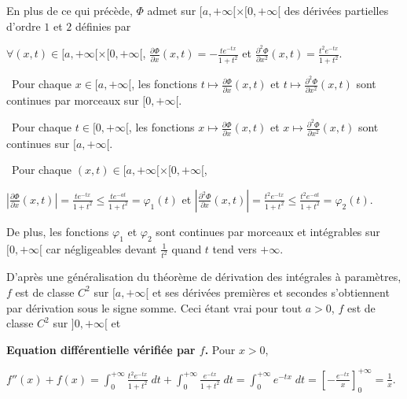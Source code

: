 {{En plus de ce qui précède, $\Phi$ admet sur $[a,+\infty[\times[0,+\infty[$ des dérivées partielles d'ordre $1$ et $2$ définies par
 
\begin{center}
$\forall(x,t)\in[a,+\infty[\times[0,+\infty[$, $\frac{\partial\Phi}{\partial x}(x,t)=-\frac{te^{-tx}}{1+t^2}$ et $\frac{\partial^2\Phi}{\partial x^2}(x,t)=\frac{t^2e^{-tx}}{1+t^2}$.
\end{center}

\textbullet~Pour chaque $x\in[a,+\infty[$, les fonctions $t\mapsto\frac{\partial\Phi}{\partial x}(x,t)$ et $t\mapsto\frac{\partial^2\Phi}{\partial x^2}(x,t)$ sont continues par morceaux sur $[0,+\infty[$.

\textbullet~Pour chaque $t\in[0,+\infty[$, les fonctions $x\mapsto\frac{\partial\Phi}{\partial x}(x,t)$ et $x\mapsto\frac{\partial^2\Phi}{\partial x^2}(x,t)$ sont continues sur $[a,+\infty[$.

\textbullet~Pour chaque $(x,t)\in[a,+\infty[\times[0,+\infty[$,

\begin{center}
$\left|\frac{\partial\Phi}{\partial x}(x,t)\right|=\frac{te^{-tx}}{1+t^2}\leqslant\frac{te^{-at}}{1+t^2}=\varphi_1(t)$ et $\left|\frac{\partial^2\Phi}{\partial x}(x,t)\right|=\frac{t^2e^{-tx}}{1+t^2}\leqslant\frac{t^2e^{-at}}{1+t^2}=\varphi_2(t)$.
\end{center}

De plus, les fonctions $\varphi_1$ et $\varphi_2$ sont continues par morceaux et intégrables sur $[0,+\infty[$ car négligeables devant $\frac{1}{t^2}$ quand $t$ tend vers $+\infty$.

D'après une généralisation du théorème de dérivation des intégrales à paramètres, $f$ est de classe $C^2$ sur $[a,+\infty[$ et ses dérivées premières et secondes s'obtiennent par dérivation sous le signe somme. Ceci étant vrai pour tout $a>0$, $f$ est de classe $C^2$ sur $]0,+\infty[$ et

\begin{center}
\end{center}

\textbf{Equation différentielle vérifiée par $f$.} Pour $x>0$,

\begin{center}
$f''(x)+f(x)=\int_{0}^{+\infty}\frac{t^2e^{-tx}}{1+t^2}\;dt+\int_{0}^{+\infty}\frac{e^{-tx}}{1+t^2}\;dt=\int_{0}^{+\infty}e^{-tx}\;dt=\left[-\frac{e^{-tx}}{x}\right]_0^{+\infty}=\frac{1}{x}$.
\end{center}

}}
